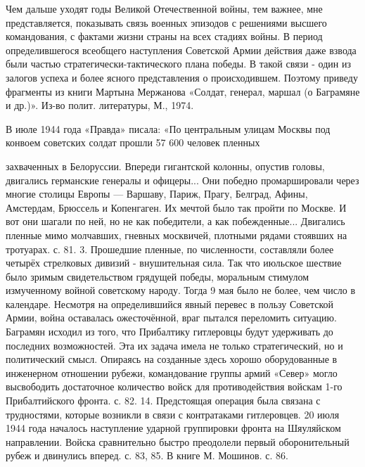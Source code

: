 \label{2-2}
Чем дальше уходят годы Великой Отечественной войны, тем важнее, мне представляется, показывать связь военных эпизодов с решениями высшего командования, с фактами жизни страны на всех стадиях войны. В период определившегося всеобщего наступления Советской Армии действия даже взвода были частью стратегически-тактического плана победы. В такой связи - один из залогов успеха и более ясного представления о происходившем. Поэтому приведу фрагменты из книги Мартына Мержанова «Солдат, генерал, маршал (о Баграмяне и др.)». Из-во полит. литературы, М., 1974.

\label{2-3}
В июле 1944 года «Правда» писала: «По центральным улицам Москвы под конвоем советских солдат прошли 57 600 человек пленных

\label{3-1}
захваченных в Белоруссии. Впереди гигантской колонны, опустив головы, двигались германские генералы и офицеры... Они победно промаршировали через многие столицы Европы — Варшаву, Париж, Прагу, Белград, Афины, Амстердам, Брюссель и Копенгаген. Их мечтой было так пройти по Москве. И вот они шагали по ней, но не как победители, а как побежденные... Двигались пленные мимо молчавших, гневных москвичей, плотными рядами стоявших на тротуарах. с. 81. 3. Прошедшие пленные, по численности, составляли более четырёх стрелковых дивизий - внушительная сила. Так что июльское шествие было зримым свидетельством грядущей победы, моральным стимулом измученному войной советскому народу. Тогда 9 мая было не более, чем число в календаре. Несмотря на определившийся явный перевес в пользу Советской Армии, война оставалась ожесточённой, враг пытался переломить ситуацию. Баграмян исходил из того, что Прибалтику гитлеровцы будут удерживать до последних возможностей. Эта их задача имела не только стратегический, но и политический смысл. Опираясь на созданные здесь хорошо оборудованные в инженерном отношении рубежи, командование группы армий «Север» могло высвободить достаточное количество войск для противодействия войскам 1-го Прибалтийского фронта. с. 82. 14. Предстоящая операция была связана с трудностями, которые возникли в связи с контратаками гитлеровцев. 20 июля 1944 года началось наступление ударной группировки фронта на Шяуляйском направлении. Войска сравнительно быстро преодолели первый оборонительный рубеж и двинулись вперед. с. 83, 85. В книге М. Мошинов. с. 86.


